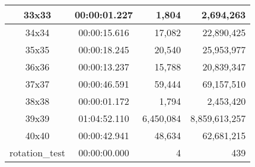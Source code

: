 \begin{center}
\begin{tabular}{|c|c|r|r|}
		33x33 & 00:00:01.227 & 1,804 & 2,694,263 \\ \hline
		34x34 & 00:00:15.616 & 17,082 & 22,890,425 \\ \hline
		35x35 & 00:00:18.245 & 20,540 & 25,953,977 \\ \hline
		36x36 & 00:00:13.237 & 15,788 & 20,839,347 \\ \hline
		37x37 & 00:00:46.591 & 59,444 & 69,157,510 \\ \hline
		38x38 & 00:00:01.172 & 1,794 & 2,453,420 \\ \hline
		39x39 & 01:04:52.110 & 6,450,084 & 8,859,613,257 \\ \hline
		40x40 & 00:00:42.941 & 48,634 & 62,681,215 \\ \hline
		rotation\_test & 00:00:00.000 & 4 & 439 \\ \hline

    \end{tabular}
\end{center}
